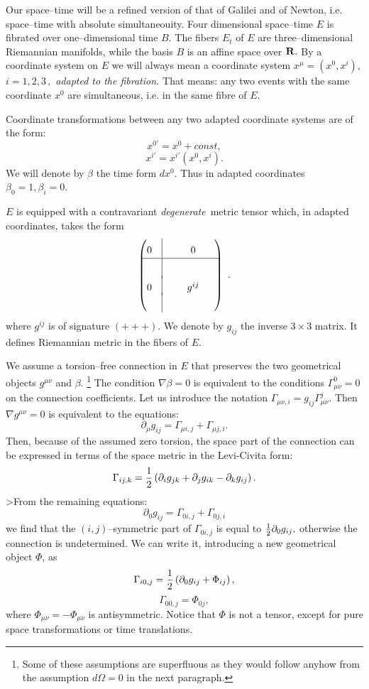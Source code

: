\documentclass[12pt]{article}
\def\be{\begin{equation}} \def\ee{\end{equation}}
\begin{document}
Our space--time will be a refined version of that of Galilei and
of Newton,  i.e.  space--time with absolute simultaneouity. 
Four dimensional space--time $E$ is fibrated over one--dimensional
time $B . $ The fibers $E_t$ of $E$ are three--dimensional
Riemannian manifolds,  while the basis $B$ is an affine space over
${\bf R} . $ By a coordinate system on $E$ we will always mean a
coordinate system $x^\mu= (x^0, x^i) , $ $i=1, 2, 3\,  , $ {\em adapted
to the
fibration.}  That means: any two events with the same coordinate $x^0$ are
simultaneous,  i.e.  in the same fibre of $E . $

Coordinate transformations between any two adapted coordinate systems
are of the form: 
$$
x^{0'}=x^0+const , 
$$
$$
x^{i'}=x^{i'}\left (x^0, x^{i}\right) . 
$$
We will denote by $\beta$ the time form $dx^0 . $ Thus in adapted
coordinates $\beta_0=1, \beta_i=0$. 

$E$ is equipped with a contravariant {\em degenerate}\, metric tensor which,
in adapted coordinates, takes the form
\def\linie{\vrule height 15pt depth 5pt}
\def\back{\noalign{\vskip-3pt}}
$$\begin{pmatrix}0 &\linie & \phantom{0 }& 0 &\phantom{0}\cr
\noalign{\hrule}
&\linie && \cr\back
0 &\linie &  & g^{ij} & 
\cr\back
& \linie && 
\end{pmatrix} \ . $$
where $g^{ij}$ is of signature $ (+++) . $ We denote by $g_{ij}$ the
inverse $3\times 3$ matrix.  It defines Riemannian metric in the
fibers of $E . $

We assume a torsion--free connection in $E$ that preserves
the two geometrical objects $g^{\mu\nu}$ and $\beta$.%
\footnote{Some of these assumptions are superfluous
as they would
follow anyhow from the assumption $d\Omega=0$ in the next
paragraph. }
The condition $\nabla\beta =0$ is equivalent to the conditions 
$\Gamma^0_{\mu\nu}=0$ on the connection coefficients.  Let us
introduce the notation $\Gamma_{\mu\nu, i}=g_{ij}\Gamma^j_{\mu\nu}. $
Then $\nabla g^{\mu\nu}=0$ is equivalent to the equations: 
\be
\partial_\mu g_{ij}=\Gamma_{\mu i, j}+\Gamma_{\mu j, i} . 
\ee
Then,  because of the assumed zero torsion,  the space part of the
connection can be expressed in terms of the space metric in
the Levi-Civita form:
\be
\Gamma_{ij, k}={1\over2}\left ( \partial_i g_{jk}+
\partial_j g_{ik}-
\partial_k g_{ij}\right) . 
\ee
>From the remaining equations:
\be
\partial_0 g_{ij}= \Gamma_{0i, j} + \Gamma_{0j, i} 
\ee
we find that the  $(i,j)$--symmetric part of $\Gamma_{0i, j}$ is equal to
${1\over2}\partial_0 g_{ij} , $ otherwise the connection is
undetermined.  We can write it, introducing a new
geometrical object $\Phi$, as
\be
\Gamma_{i0, j}={1\over2}\left (\partial_0 g_{ij}+\Phi_{ij}\right) , 
\ee
\be
\Gamma_{00, j}=\Phi_{0j} , 
\ee
where $\Phi_{\mu\nu}=-\Phi_{\mu\nu}$ is antisymmetric. Notice
that $\Phi$ is not a tensor, except for pure space transformations
or time translations.
\end{document}
